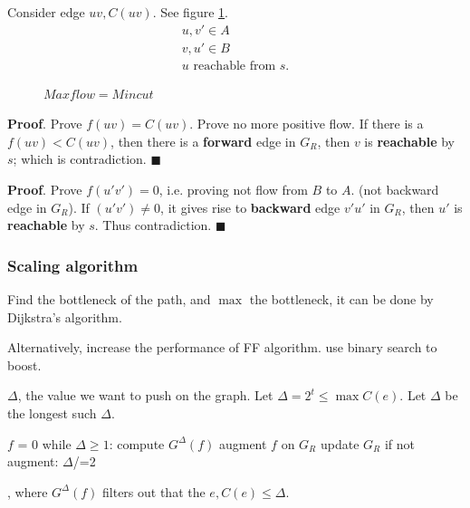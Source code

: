 \documentclass[a4paper]{report}
\begin{document}
Consider edge $uv, C(uv)$. See figure \ref{fig:7_5}. 
\begin{align*}
u,v' \in A\\
v,u' \in B \\ 
u \text{ reachable from } s. 
\end{align*}
\begin{figure}[!htp]
\centering
{}
\caption{$Maxflow = Mincut$}
\label{fig:7_5}
\end{figure}

\textbf{Proof}. Prove $f(uv)=C(uv)$. Prove no more positive flow. If there is a $f(uv)< C(uv)$, then there is a \textbf{forward} edge in $G_R$, then $v$ is \textbf{reachable} by $s$; which is contradiction. $\blacksquare$

\textbf{Proof}. Prove $f(u'v')=0$, i.e. proving not flow from $B$ to $A$. (not backward edge in $G_R$). If $(u'v')\neq 0$, it gives rise to \textbf{backward} edge $v'u'$ in $G_R$, then $u'$ is \textbf{reachable} by $s$. Thus contradiction. $\blacksquare$
\subsubsection{Scaling algorithm}
Find the bottleneck of the path, and $\max$ the bottleneck, it can be done by Dijkstra's algorithm. 

Alternatively, increase the performance of FF algorithm. use binary search to boost. 

$\Delta$, the value we want to push on the graph. Let $\Delta=2^t \leq \max C(e)$. Let $\Delta$ be the longest such $\Delta$.
\begin{python}[mathescape]
$f$ = 0
while $\Delta\geq 1$:
  compute $G^\Delta(f)$
  augment $f$ on $G_R$
  update $G_R$
  if not augment:
    $\Delta$/=2
\end{python}
, where $G^\Delta(f)$ filters out that the $e, C(e)\leq \Delta$. 
\end{document}
